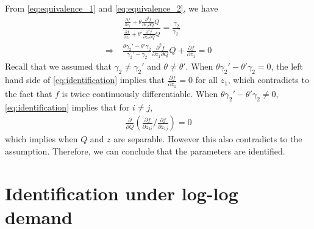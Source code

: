\documentclass[11pt]{article}
\numberwithin{figure}{section}
\theoremstyle{definition}
\newcommand{\0}{\mathbf{0}}
\begin{document}
From \eqref{eq:equivalence_1} and \eqref{eq:equivalence_2}, we have
\begin{align}\label{eq:identification}
    &\frac{\frac{\partial f}{\partial z_1} + \theta \frac{\partial^2 f}{\partial z_1\partial Q}Q}{\frac{\partial f}{\partial z_1} + \theta' \frac{\partial^2 f}{\partial z_1\partial Q}Q} = \frac{\gamma_2}{\gamma_2'}\nonumber\\
    \Longrightarrow\ & \frac{\theta \gamma_2' - \theta' \gamma_2}{\gamma_2' - \gamma_2}\frac{\partial^2 f}{\partial z_1\partial Q}Q  +    \frac{\partial f}{\partial z_1} = 0
\end{align}
Recall that we assumed that $\gamma_2\ne \gamma_2'$ and $\theta\ne \theta'$. When $ \theta \gamma_2' - \theta' \gamma_2 = 0$, the left hand side of \eqref{eq:identification} implies that $\frac{\partial f}{\partial z_1} = 0$ for all $z_1$, which contradicts to the fact that $f$ is twice continuously differentiable. When  $ \theta \gamma_2' - \theta' \gamma_2 \ne 0$, \eqref{eq:identification} implies that for $i \ne j$, 
\begin{align}
    \frac{\partial }{\partial Q}\left( {\frac{\partial f}{\partial z_{1i}}}/{\frac{\partial f}{\partial z_{1j}}}    \right) = 0
\end{align}
which implies when $Q$ and $z$ are separable. However this also contradicts to the assumption.
Therefore, we can conclude that the parameters are identified.



\section{Identification under log-log demand}
\end{document}
